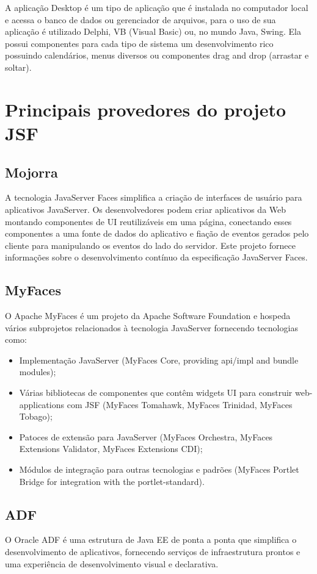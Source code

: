 \documentclass[12pt,a4paper]{article}
\begin{document}
A aplicação Desktop é um tipo de aplicação que é instalada no computador local e acessa o banco de dados ou gerenciador de arquivos, para o uso de sua aplicação é utilizado Delphi, VB (Visual Basic) ou, no mundo Java, Swing. Ela possui componentes para cada tipo de sistema um desenvolvimento rico possuindo calendários, menus diversos ou componentes drag and drop (arrastar e soltar).

\section{Principais provedores do projeto JSF}
\subsection{Mojorra}
A tecnologia JavaServer Faces simplifica a criação de interfaces de usuário para aplicativos JavaServer. Os desenvolvedores podem criar aplicativos da Web montando componentes de UI reutilizáveis em uma página, conectando esses componentes a uma fonte de dados do aplicativo e fiação de eventos gerados pelo cliente para manipulando os eventos do lado do servidor. Este projeto fornece informações sobre o desenvolvimento contínuo da especificação JavaServer Faces.

\subsection{MyFaces}
O Apache MyFaces é um projeto da Apache Software Foundation e hospeda vários subprojetos relacionados à tecnologia JavaServer fornecendo tecnologias como:
\begin{itemize}
\item Implementação JavaServer (MyFaces Core, providing api/impl and bundle modules);

\item Várias bibliotecas de componentes que contêm widgets UI para construir web-applications com JSF (MyFaces Tomahawk, MyFaces Trinidad, MyFaces Tobago);

\item Patoces de extensão para JavaServer (MyFaces Orchestra, MyFaces Extensions Validator, MyFaces Extensions CDI);

\item Módulos de integração para outras tecnologias e padrões (MyFaces Portlet Bridge for integration with the portlet-standard).
\end{itemize}

\subsection{ADF}
O Oracle ADF é uma estrutura de Java EE de ponta a ponta que simplifica o desenvolvimento de aplicativos, fornecendo serviços de infraestrutura prontos e uma experiência de desenvolvimento visual e declarativa.
\end{document}

